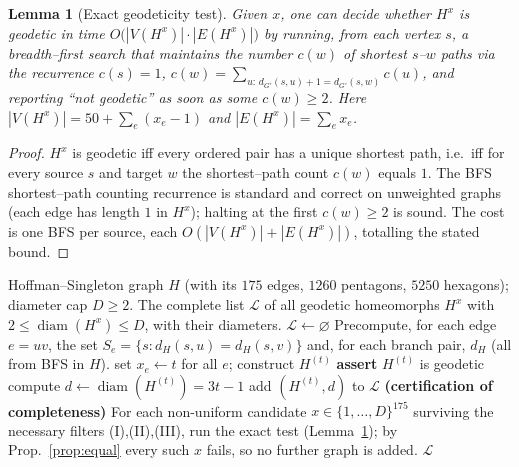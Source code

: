 \documentclass{amsart}
\theoremstyle{plain}
\newtheorem{lemma}{Lemma}
\theoremstyle{definition}
\newcommand{\dG}{d_{G'}}
\newcommand{\dH}{d_{H}}
\begin{document}
\begin{lemma}[Exact geodeticity test]\label{lem:geocheck}
Given $x$, one can decide whether $H^x$ is geodetic in time
$O\!\bigl(|V(H^x)|\cdot|E(H^x)|\bigr)$ by running, from each vertex $s$, a
breadth--first search that maintains the number $c(w)$ of shortest $s$--$w$ paths via
the recurrence $c(s)=1$, $c(w)=\sum_{u:\,\dG(s,u)+1=\dG(s,w)}c(u)$, and reporting
``not geodetic'' as soon as some $c(w)\ge2$. Here $|V(H^x)|=50+\sum_e(x_e-1)$ and
$|E(H^x)|=\sum_e x_e$.
\end{lemma}

\begin{proof}
$H^x$ is geodetic iff every ordered pair has a unique shortest path, i.e.\ iff for
every source $s$ and target $w$ the shortest--path count $c(w)$ equals $1$. The BFS
shortest--path counting recurrence is standard and correct on unweighted graphs
(each edge has length $1$ in $H^x$); halting at the first $c(w)\ge2$ is sound. The
cost is one BFS per source, each $O(|V(H^x)|+|E(H^x)|)$, totalling the stated bound.
\end{proof}

\begin{algorithm}[h]
\caption{Enumerate geodetic homeomorphs of $H$ of diameter $\le D$}
\begin{algorithmic}[1]
\Require Hoffman--Singleton graph $H$ (with its $175$ edges, $1260$ pentagons,
$5250$ hexagons); diameter cap $D\ge2$.
\Ensure The complete list $\mathcal L$ of all geodetic homeomorphs $H^x$ with
$2\le\operatorname{diam}(H^x)\le D$, with their diameters.
\State $\mathcal L\gets\varnothing$
\State Precompute, for each edge $e=uv$, the set $S_e=\{s:\dH(s,u)=\dH(s,v)\}$ and,
for each branch pair, $\dH$ (all from BFS in $H$). 
 
    \State set $x_e\gets t$ for all $e$; \quad construct $H^{(t)}$
    \State \textbf{assert} $H^{(t)}$ is geodetic 
    \State compute $d\gets\operatorname{diam}(H^{(t)})=3t-1$
     add $(H^{(t)},d)$ to $\mathcal L$ \EndIf
  \EndIf
\EndFor
\State \textbf{(certification of completeness)} For each non-uniform candidate
$x\in\{1,\dots,D\}^{175}$ surviving the necessary filters (I),(II),(III), run the
exact test (Lemma~\ref{lem:geocheck}); by Prop.~\ref{prop:equal} every such $x$
fails, so no further graph is added.
\State \Return $\mathcal L$
\end{algorithmic}
\end{algorithm}
\end{document}
